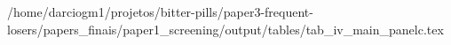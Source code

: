 /home/darciogm1/projetos/bitter-pills/paper3-frequent-losers/papers_finais/paper1_screening/output/tables/tab_iv_main_panelc.tex
